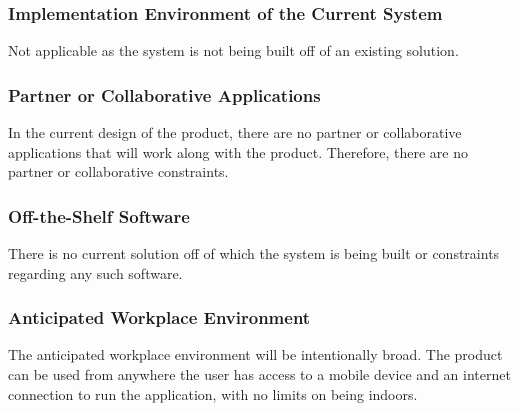 \documentclass[12pt]{article}
\begin{document}
\subsubsection{Implementation Environment of the Current System}
Not applicable as the system is not being built off of an existing solution. 

\subsubsection{Partner or Collaborative Applications}
In the current design of the product, there are no partner or collaborative applications that will
work along with the product. Therefore, there are no partner or collaborative constraints.

\subsubsection{Off-the-Shelf Software}
There is no current solution off of which the system is being built or constraints regarding any such software. 

\subsubsection{Anticipated Workplace Environment}
The anticipated workplace environment will be intentionally broad. The product can be used from anywhere the user has access to a mobile device and an internet connection to run the application, with no limits on being indoors. 
\end{document}
